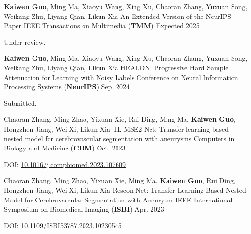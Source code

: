 


\newcommand{\papersaddspace}[0]{
  \vspace{5.5mm}
}



\begin{cventries}

  \cventry
  {\textbf{Kaiwen Guo}, Ming Ma, Xiaoyu Wang, Xing Xu, Chaoran Zhang, Yuxuan Song, Weikang Zhu, Liyang Qian, Likun Xia} %
  {An Extended Version of the NeurIPS Paper} %
  {IEEE Transactions on Multimedia (\textbf{TMM})} %
  {Expected 2025} %
  {
    \begin{cvitems}
      \item{Under review.}
    \end{cvitems}
  }
  \papersaddspace

  \cventry
  {\textbf{Kaiwen Guo}, Ming Ma, Xiaoyu Wang, Xing Xu, Chaoran Zhang, Yuxuan Song, Weikang Zhu, Liyang Qian, Likun Xia} %
  {HEALON: Progressive Hard Sample Attenuation for Learning with Noisy Labels} %
  {Conference on Neural Information Processing Systems (\textbf{NeurIPS})} %
  {Sep. 2024} %
  {
    \begin{cvitems}
      \item{Submitted.}
    \end{cvitems}
  }
  \papersaddspace
  \cventry
  {Chaoran Zhang, Ming Zhao, Yixuan Xie, Rui Ding, Ming Ma, \textbf{Kaiwen Guo}, Hongzhen Jiang, Wei Xi, Likun Xia} %
  {TL-MSE2-Net: Transfer learning based nested model for cerebrovascular segmentation with aneurysms} %
  {Computers in Biology and Medicine (\textbf{CBM})} %
  {Oct. 2023} %
  {
    \begin{cvitems}
      \item{DOI: \href{https://doi.org/10.1016/j.compbiomed.2023.107609}{10.1016/j.compbiomed.2023.107609}}
    \end{cvitems}
  }
  \papersaddspace
  \cventry
  {Chaoran Zhang, Ming Zhao, Yixuan Xie, Ming Ma, \textbf{Kaiwen Guo}, Rui Ding, Hongzhen Jiang, Wei Xi, Likun Xia} %
  {Rescon-Net: Transfer Learning Based Nested Model for Cerebrovascular Segmentation with Aneurysm} %
  {IEEE International Symposium on Biomedical Imaging (\textbf{ISBI})} %
  {Apr. 2023} %
  {
    \begin{cvitems}
      \item{DOI: \href{https://doi.org/10.1109/ISBI53787.2023.10230545}{10.1109/ISBI53787.2023.10230545}}
    \end{cvitems}
  }


\end{cventries}
